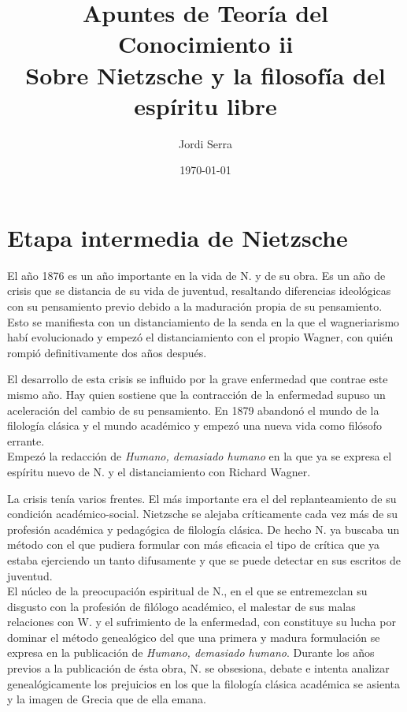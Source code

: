 \documentclass[a4paper, 10pt, twocolumn, spanish]{article}
\author{Jordi Serra}
\date{\today}
\title{Apuntes de Teoría del Conocimiento ii\\\medskip
\large Sobre Nietzsche y la filosofía del espíritu libre}
\begin{document}
\maketitle
\tableofcontents


\section{Etapa intermedia de Nietzsche}
\label{sec:org03df3ca}
El año 1876 es un año importante en la vida de N. y de su obra. Es un
año de crisis que se distancia de su vida de juventud, resaltando
diferencias ideológicas con su pensamiento previo debido a la
maduración propia de su pensamiento. Esto se manifiesta con un
distanciamiento de la senda en la que el wagneriarismo habí
evolucionado y empezó el distanciamiento con el propio Wagner, con
quién rompió definitivamente dos años después.

El desarrollo de esta crisis se influido por la grave enfermedad que
contrae este mismo año. Hay quien sostiene que la contracción de la
enfermedad supuso un aceleración del cambio de su pensamiento. En 1879
abandonó el mundo de la filología clásica y el mundo académico y
empezó una nueva vida como filósofo errante.\\[0pt]

Empezó la redacción de \emph{Humano, demasiado humano} en la que ya se
expresa el espíritu nuevo de N. y el distanciamiento con Richard
Wagner.

La crisis tenía varios frentes. El más importante era el del
replanteamiento de su condición académico-social. Nietzsche se alejaba
críticamente cada vez más de su profesión académica y pedagógica de
filología clásica. De hecho N. ya buscaba un método con el que pudiera
formular con más eficacia el tipo de crítica que ya estaba ejerciendo
un tanto difusamente y que se puede detectar en sus escritos de
juventud.\\[0pt]

El núcleo de la preocupación espiritual de N., en el que se
entremezclan su disgusto con la profesión de filólogo académico, el
malestar de sus malas relaciones con W. y el sufrimiento de la
enfermedad, con constituye su lucha por dominar el método genealógico
del que una primera y madura formulación se expresa en la publicación
de \emph{Humano, demasiado humano}. Durante los años previos a la
publicación de ésta obra, N. se obsesiona, debate e intenta analizar
genealógicamente los prejuicios en los que la filología clásica
académica se asienta y la imagen de Grecia que de ella emana.\\[0pt]
\end{document}
